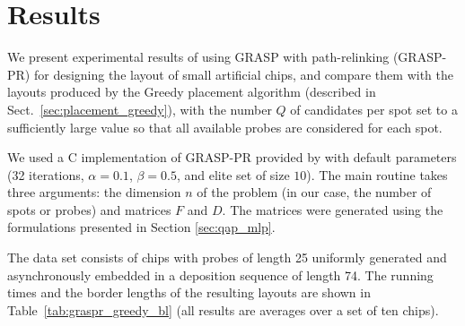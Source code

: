 \section{Results}
\label{sec:qap_results}

We present experimental results of using GRASP with path-relinking (GRASP-PR)
for designing the layout of small artificial chips, and compare them with the
layouts produced by the Greedy placement algorithm (described in
Sect.~\ref{sec:placement_greedy}), with the number $Q$ of candidates per spot
set to a sufficiently large value so that all available probes are considered
for each spot.

We used a C implementation of GRASP-PR provided by \citet{Oliveira2004} with
default parameters (32 iterations, $\alpha=0.1$, $\beta=0.5$, and elite set of
size $10$). The main routine takes three arguments: the dimension $n$ of the
problem (in our case, the number of spots or probes) and matrices $F$ and $D$.
The matrices were generated using the formulations presented in Section
\ref{sec:qap_mlp}.

The data set consists of chips with probes of length 25 uniformly generated and
asynchronously embedded in a deposition sequence of length 74. The running times
and the border lengths of the resulting layouts are shown in
Table~\ref{tab:graspr_greedy_bl} (all results are averages over a set of ten
chips).

